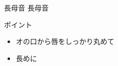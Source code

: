 \documentclass[aspectratio=169, xcolor={dvipsnames,table}]{beamer}
\begin{document}
\begin{frame}[plain]{長母音 }
  {\Large 長母音} {\Huge{}}

  \vspace*{20pt}

  \normalsize ポイント

  \begin{itemize}
    [circle]

    \item オの口から唇をしっかり丸めて

    \item 長めに
  \end{itemize}

\end{frame}
\end{document}
